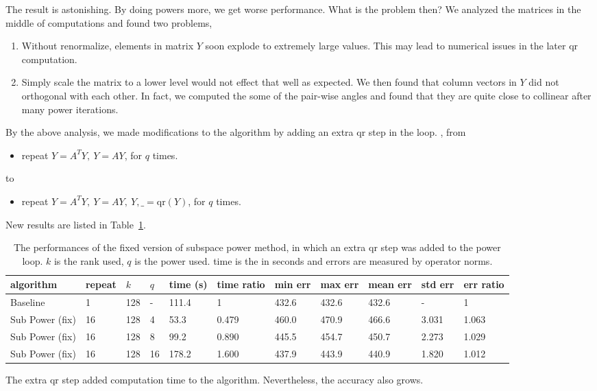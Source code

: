 The result is astonishing.
By doing powers more,
we get worse performance.
What is the problem then?
We analyzed the matrices in the middle of computations and
found two problems,
\begin{enumerate}
    \item Without renormalize,
        elements in matrix $Y$ soon explode to extremely large values.
        This may lead to numerical issues in the later qr computation.
    \item Simply scale the matrix to a lower level would not effect
        that well as expected.
        We then found that column vectors in $Y$ did not orthogonal with each other.
        In fact, we computed the some of the pair-wise angles
        and found that they are quite close to collinear after
        many power iterations.
\end{enumerate}

By the above analysis,
we made modifications to the algorithm
by adding an extra qr step in the loop.
\ie, from
\begin{itemize}
    \item repeat $Y = A^T Y,\  Y=AY$, for $q$ times.
\end{itemize}
to
\begin{itemize}
    \item repeat $Y = A^T Y,\  Y=AY,\  Y,\_=\text{qr}(Y)$, for $q$ times.
\end{itemize}

New results are listed in Table~\ref{tab:fix}.

\begin{table}[htb]
  \setlength{\tabcolsep}{2.6pt}
  \caption{The performances of the fixed version of subspace power method,
    in which an extra qr step was added to the power loop.
    $k$ is the rank used, $q$ is the power used.
    time is the in seconds and
    errors are measured by operator norms.
    }
  \label{tab:fix}
  \centering
  {\small
  \begin{tabular}{lllllllllll}
    \toprule
    algorithm & repeat & $k$ & $q$ & time (s) & time ratio & min err & max err & mean err & std err & err ratio \\
    \midrule
    Baseline & 1 & 128 & - & 111.4 & 1 & 432.6 & 432.6 & 432.6 & - & 1 \\
    Sub Power (fix) & 16 & 128 & 4 & 53.3 & 0.479 & 460.0 & 470.9 & 466.6 & 3.031 & 1.063 \\
    Sub Power (fix) & 16 & 128 & 8 & 99.2 & 0.890 & 445.5 & 454.7 & 450.7 & 2.273 & 1.029 \\
    Sub Power (fix) & 16 & 128 & 16 & 178.2 & 1.600 & 437.9 & 443.9 & 440.9 & 1.820 & 1.012 \\
    \bottomrule
  \end{tabular}
  }
\end{table}

The extra qr step added computation time to the algorithm.
Nevertheless, the accuracy also grows.
